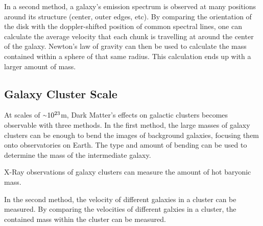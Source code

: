 In a second method, a galaxy's emission spectrum is observed at many positions around its structure (center, outer edges, etc).
By comparing the orientation of the disk with the doppler-shifted position of common spectral lines, one can calculate the average velocity that each chunk is travelling at around the center of the galaxy.
Newton's law of gravity can then be used to calculate the mass contained within a sphere of that same radius.
This calculation ends up with a larger amount of mass.

\subsection{Galaxy Cluster Scale}
%
At scales of $\nicetilde 10^{23}$m, Dark Matter's effects on galactic clusters becomes observable with three methods.
In the first method, the large masses of galaxy clusters can be enough to bend the images of background galaxies, focusing them onto observatories on Earth.
The type and amount of bending can be used to determine the mass of the intermediate galaxy.

X-Ray observations of galaxy clusters can measure the amount of hot baryonic mass.

In the second method, the velocity of different galaxies in a cluster can be measured.
By comparing the velocities of different galxies in a cluster, the contained mass within the cluster can be measured.



